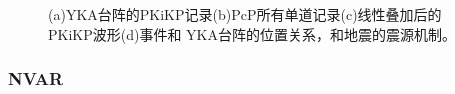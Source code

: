 \begin{figure}[!ht]
{}
	\hspace{3em}
	\caption{(a)YKA台阵的PKiKP记录(b)PcP所有单道记录(c)线性叠加后的PKiKP波形(d)事件和%
YKA台阵的位置关系，和地震的震源机制。}
\end{figure}

\newpage

\subsubsection{NVAR}


